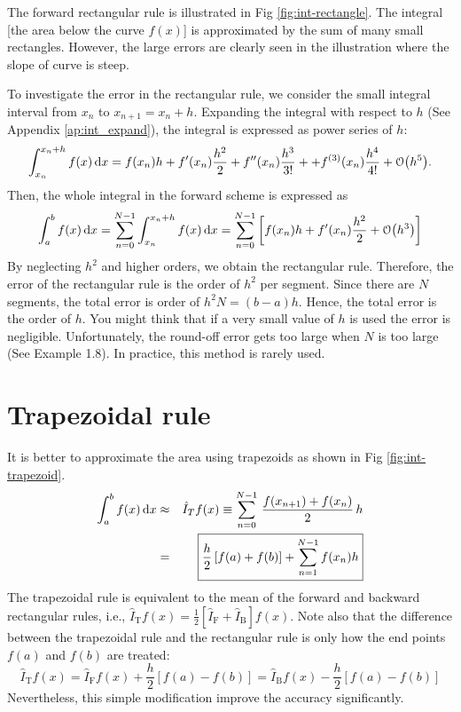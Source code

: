 The forward rectangular rule is illustrated in Fig \ref{fig:int-rectangle}. The integral [the area below the curve $f(x)$] is approximated by the sum of many small rectangles.
However, the large errors are clearly seen in the illustration where the slope of curve is steep.

To investigate the error in the rectangular rule, we consider the small integral interval from $x_{n}$ to $x_{n+1}=x_n+h$.  Expanding the integral with respect to $h$ (See Appendix \ref{ap:int_expand}),  the integral is expressed as power series of $h$:
\begin{equation}\label{eq:int+expand}
\int_{x_{n}}^{x_{n}+h} f(x) \dd{x} = f(x_n) h + f'(x_n) \frac{h^2}{2} + f''(x_n) \frac{h^3}{3!} + + f^{(3)}(x_n) \frac{h^4}{4!} + \order{h^5}.
\end{equation}
Then, the whole integral in the forward scheme is expressed as
\begin{equation}
\int_a^b f(x) \dd{x} = \sum_{n=0}^{N-1} \int_{x_{n}}^{x_{n}+h} f(x) \dd{x} =  \sum_{n=0}^{N-1} \left [f(x_n) h + f'(x_n) \frac{h^2}{2} + \order{h^3} \right ]
\end{equation}
By neglecting $h^2$ and higher orders, we obtain the rectangular rule.
Therefore, the error of the rectangular rule is the order of $h^2$ per segment.  Since there are $N$ segments, the total error is
order of $h^2 N = (b-a) h$.  Hence, the total error is the order of $h$.  You might think that if a very small value of $h$ is used the error is negligible. Unfortunately, the round-off error gets too large when $N$ is too large (See Example 1.8). In practice, this method is rarely used.

\section{Trapezoidal rule}


It is better to approximate the area using trapezoids as shown in Fig \ref{fig:int-trapezoid}.
\begin{eqnarray}\label{eq:trapezoidal rule}
\int_a^b f(x)\, \text{d} x &\approx& \hat{I}_{T} f(x) \equiv \sum_{n=0}^{N-1}\, \frac{f(x_{n+1})+f(x_{n})}{2}\, h \\
&=& \fbox{$\displaystyle\frac{h}{2} \left [ f(a) + f(b) \right ] + \sum_{n=1}^{N-1} f(x_n) h $}
\end{eqnarray}
The trapezoidal rule is equivalent to the mean of the forward and backward rectangular rules, i.e., $\hat{I}_\text{T} f(x) = \frac{1}{2} \left [ \hat{I}_\text{F} + \hat{I}_\text{B} \right ]f(x)$.  Note also that the difference between the trapezoidal rule and the rectangular rule is only how the end points $f(a)$ and $f(b)$ are treated:
\begin{equation}
\hat{I}_\text{T} f(x) = \hat{I}_\text{F} f(x)+\frac{h}{2} \left [ f(a) - f(b) \right ] = \hat{I}_\text{B} f(x) - \frac{h}{2} \left [ f(a) - f(b) \right ]
\end{equation}
Nevertheless, this simple modification improve the accuracy significantly.  

